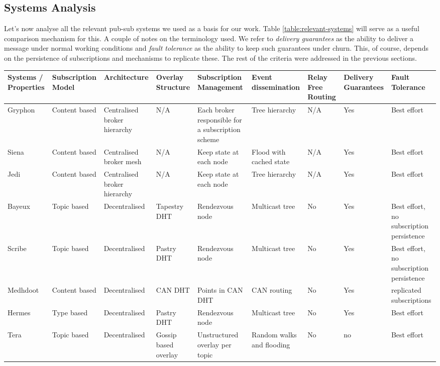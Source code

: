 \subsection{Systems Analysis}\label{systems-overview}

Let's now analyse all the relevant pub-sub systems we used as a basis for our
work. Table \ref{table:relevant-systems} will serve as a useful comparison
mechanism for this.  A couple of notes on the terminology used. We refer to
\emph{delivery guarantees} as the ability to deliver a message under normal
working conditions and \emph{fault tolerance} as the ability to keep such
guarantees under churn. This, of course, depends on the persistence of
subscriptions and mechanisms to replicate these. The rest of the criteria were
addressed in the previous sections.

\begin{table}
  \center
    \begin{tabular}{|P{3cm}|P{2cm}P{2cm}P{2cm}P{2.5cm}P{2cm}P{2cm}P{2cm}P{2cm}|}\hline
    Systems / Properties & Subscription Model & Architecture & Overlay Structure & Subscription Management & Event dissemination & Relay Free Routing & Delivery Guarantees & Fault Tolerance \\\hline
    Gryphon & Content based & Centralised broker hierarchy & N/A & Each broker responsible for a subscription scheme & Tree hierarchy & N/A & Yes & Best effort \\\hline
    Siena & Content based & Centralised broker mesh & N/A & Keep state at each node & Flood with cached state & N/A & Yes & Best effort \\\hline
    Jedi & Content based & Centralised broker hierarchy & N/A & Keep state at each node & Tree hierarchy & N/A & Yes & Best effort \\\hline
    Bayeux & Topic based & Decentralised & Tapestry DHT & Rendezvous node & Multicast tree & No & Yes & Best effort, no subscription persistence \\\hline
    Scribe & Topic based & Decentralised & Pastry DHT & Rendezvous node & Multicast tree & No & Yes & Best effort, no subscription persistence \\\hline
    Medhdoot & Content based & Decentralised & CAN DHT & Points in CAN DHT & CAN routing  & No & Yes & replicated subscriptions \\\hline
    Hermes & Type based & Decentralised & Pastry DHT & Rendezvous node & Multicast tree & No & Yes & Best effort \\\hline
    Tera & Topic based & Decentralised & Gossip based overlay & Unstructured overlay per topic & Random walks and flooding & No & no & Best effort \\\hline

\end{tabular}
\end{table}
